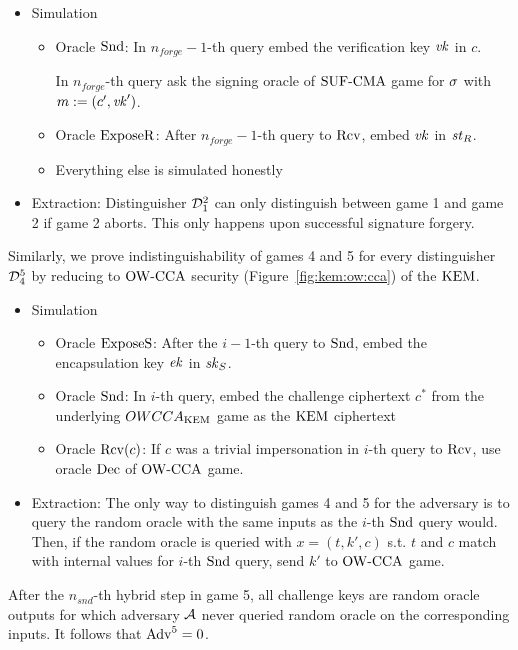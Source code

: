 \begin{itemize}
    \item Simulation
    \begin{itemize}
        \item Oracle $\mathrm{Snd}$: 
        In $n_{forge}-1$-th query embed the verification key $\mathit{vk}$ in $c$.\par
        In $n_{forge}$-th query ask the signing oracle of ${\mathrm{SUF}\text{-}\mathrm{CMA}}$ game for $\sigma$ with $m:=(c',\mathit{vk}')$.
        \item  Oracle $\mathrm{ExposeR}$: 
        After $n_{forge}-1$-th query to $\mathrm{Rcv}$, embed $\mathit{vk}$ in $\mathit{st}_R$.
        \item Everything else is simulated honestly
    \end{itemize}
    \item Extraction: Distinguisher $\mathcal{D}_1^2$ can only distinguish between game 1 and game 2 if game 2 aborts.
    This only happens upon successful signature forgery.
\end{itemize}

Similarly, we prove indistinguishability of games 4 and 5 for every distinguisher $\mathcal{D}_4^5$ by reducing to ${\mathrm{OW}\text{-}\mathrm{CCA}}$ security (Figure~\ref{fig:kem:ow:cca}) of the $\mathrm{KEM}$.

\begin{itemize}
    \item Simulation
    \begin{itemize}
        \item Oracle $\mathrm{ExposeS}$: 
        After the $i-1$-th query to $\mathrm{Snd}$, embed the encapsulation key $\mathit{ek}$ in $\mathit{sk}_S$.
        \item  Oracle $\mathrm{Snd}$: 
        In $i$-th query, embed the challenge ciphertext $c^*$ from the underlying $OWCCA_{\mathrm{KEM}}$ game as the $\mathrm{KEM}$ ciphertext 
        \item Oracle $\mathrm{Rcv}(c)$: If $c$ was a trivial impersonation in $i$-th query to $\mathrm{Rcv}$, use oracle $\mathrm{Dec}$ of ${\mathrm{OW}\text{-}\mathrm{CCA}}$ game.
    \end{itemize}
    \item Extraction: The only way to distinguish games 4 and 5 for the adversary is to query the random oracle with the same inputs as the $i$-th $\mathrm{Snd}$ query would.
    Then, if the random oracle is queried with $x=(t,k',c)$ s.t. $t$ and $c$ match with internal values for $i$-th $\mathrm{Snd}$ query, send $k'$ to ${\mathrm{OW}\text{-}\mathrm{CCA}}$ game.
\end{itemize}

After the $n_{snd}$-th hybrid step in game 5, all challenge keys are random oracle outputs for which adversary $\mathcal{A}$ never queried random oracle on the corresponding inputs.
It follows that $\mathrm{Adv}^5=0$.

